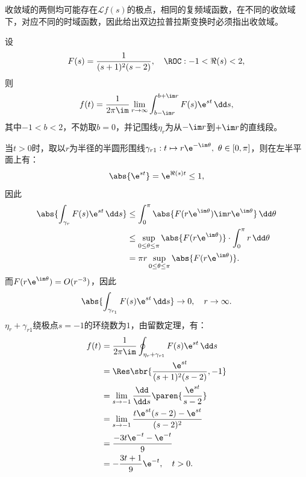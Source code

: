 收敛域的两侧均可能存在$\mathcal{L}f(s)$的极点，相同的复频域函数，在不同的收敛域下，对应不同的时域函数，因此给出双边拉普拉斯变换时必须指出收敛域。

\begin{example}
    设
    \begin{equation}
        F(s)=\frac{1}{(s+1)^2(s-2)},\quad \ROC:-1<\Re(s)<2,
    \end{equation}
    则
    \begin{equation}
        f(t)=\frac{1}{2\pi\im}\lim_{r\to\infty}\int_{b-\im r}^{b+\im r}F(s)\e^{st}\,\dd s,
    \end{equation}
    其中$-1<b<2$，不妨取$b=0$，并记围线$\eta_r$为从$-\im r$到$+\im r$的直线段。

    当$t>0$时，取以$r$为半径的半圆形围线$\gamma_{r1}:t\mapsto r\e^{-\im\theta},\ \theta\in[0,\pi]$，则在左半平面上有：
    \begin{equation}
        \abs{\e^{st}}=\e^{\Re(s)t}\leq 1,
    \end{equation}
    因此
    \begin{align}
        \abs{\int_{\gamma_r}F(s)\e^{st}\,\dd s}&\leq\int_0^{\pi}\abs{F(r\e^{\im\theta})\im r\e^{\im\theta}}\,\dd\theta\nonumber\\
        &\leq\sup_{0\leq\theta\leq\pi}\abs{F(r\e^{\im\theta})}\cdot\int_0^{\pi}r\,\dd\theta\nonumber\\
        &=\pi r\sup_{0\leq\theta\leq\pi}\abs{F(r\e^{\im\theta})}.
    \end{align}
    而$F(r\e^{\im\theta})=O(r^{-3})$，因此
    \begin{equation}
        \abs{\int_{\gamma_{r_1}}F(s)\e^{st}\,\dd s}\to 0,\quad r\to\infty.
    \end{equation}
    $\eta_r+\gamma_{r1}$绕极点$s=-1$的环绕数为$1$，由留数定理，有：
    \begin{align}
        f(t)&=\frac{1}{2\pi\im}\oint_{\eta_r+\gamma_{r1}}F(s)\e^{st}\,\dd s\nonumber\\
        &=\Res\sbr{\frac{\e^{st}}{(s+1)^2(s-2)},-1}\nonumber\\
        &=\lim_{s\to -1}\frac{\dd}{\dd s}\paren{\frac{\e^{st}}{s-2}}\nonumber\\
        &=\lim_{s\to -1}\frac{t\e^{st}(s-2)-\e^{st}}{(s-2)^2}\nonumber\\
        &=\frac{-3t\e^{-t}-\e^{-t}}{9}\nonumber\\
        &=-\frac{3t+1}{9}\e^{-t},\quad t>0.
    \end{align}


\end{example}
